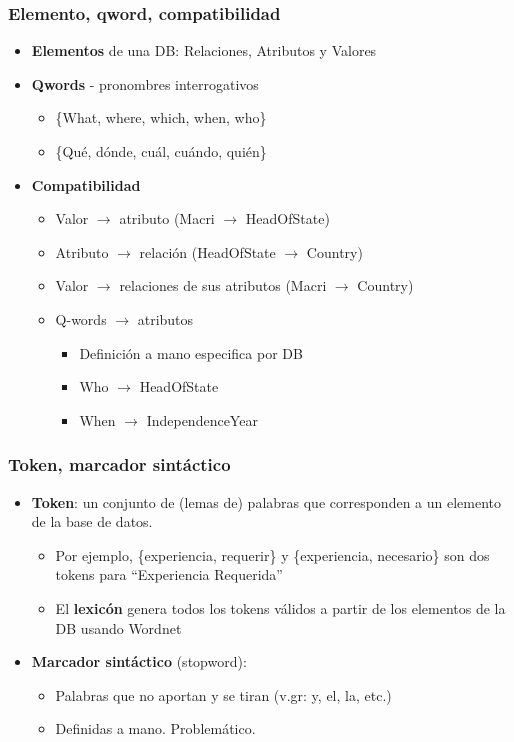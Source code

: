 \fontsize{9.5pt}{7.2}\selectfont
\begin{frame}[<+->]
  \frametitle{Elemento, qword, compatibilidad}
   \begin{itemize}
      \item \textbf{Elementos} de una DB: Relaciones, Atributos y Valores
      \item \textbf{Qwords} - pronombres interrogativos
      \begin{itemize}
          \item \{What, where, which, when, who\}
          \item \{Qué, dónde, cuál, cuándo, quién\}
      \end{itemize}
      \item \textbf{Compatibilidad}
      \begin{itemize}
          \item Valor $\rightarrow$ atributo (Macri $\rightarrow$ HeadOfState)
          \item Atributo  $\rightarrow$  relación (HeadOfState $\rightarrow$ Country)
          \item Valor $\rightarrow$ relaciones de sus atributos (Macri $\rightarrow$ Country)
          \item {\color{blue}Q-words $\rightarrow$ atributos}
          \begin{itemize}
            \item Definición a mano especifica por DB
            \item Who $\rightarrow$ HeadOfState
            \item When $\rightarrow$ IndependenceYear 
          \end{itemize}
      \end{itemize}
    \end{itemize}
\end{frame}


\begin{frame}[<+->]
  \frametitle{Token, marcador sintáctico}
   \begin{itemize}
          \item \textbf{Token}: un conjunto de (lemas de) palabras que corresponden a un elemento de la base de datos.
      \begin{itemize}
            \item Por ejemplo, \{experiencia, requerir\} y \{experiencia, necesario\} son dos tokens para ``Experiencia Requerida''
            \item El {\color{red}\textbf{lexicón}} genera todos los tokens válidos a partir de los elementos de la DB usando Wordnet
      \end{itemize}
      \item \textbf{Marcador sintáctico} (stopword):
      \begin{itemize}
        \item Palabras que no aportan y se tiran (v.gr: y, el, la, etc.)
        \item Definidas a mano. Problemático.
      \end{itemize}
    \end{itemize}
\end{frame}



